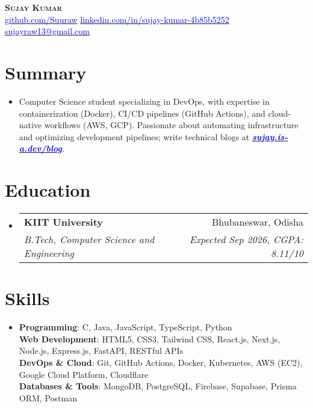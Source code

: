 \documentclass[letterpaper,11pt]{article}
\makeatletter
\newcommand{\resumeSubheading}[4]{
  \vspace{-3pt}\item
  \begin{tabular*}{0.98\textwidth}[t]{l@{\extracolsep{\fill}}r}
    \textbf{#1} & #2 \\
    \textit{\small#3} & \textit{\small #4} \\
  \end{tabular*}\vspace{-6pt}
}
\newcommand{\resumeSubHeadingListStart}{\begin{itemize}[leftmargin=0.1in, label={}]}
\newcommand{\resumeSubHeadingListEnd}{\end{itemize}\vspace{-6pt}}
\makeatother
\begin{document}
\begin{center}
  \textbf{\Huge \scshape Sujay Kumar} \\ \vspace{8pt}
  \small
  \vspace{2pt}
 \href{https://github.com/Suuraw}{\textcolor{blue}{github.com/Suuraw}} \quad
\href{https://linkedin.com/in/sujay-kumar-4b85b5252}{\textcolor{blue}{linkedin.com/in/sujay-kumar-4b85b5252}} \quad
 \href{mailto:sujayraw13@gmail.com}{\textcolor{blue}{sujayraw13@gmail.com}} 
\end{center}
\vspace{-8pt}

\section{Summary}
\vspace{4pt}
\resumeSubHeadingListStart
\item{Computer Science student specializing in DevOps, with expertise in containerization (Docker), CI/CD pipelines (GitHub Actions), and cloud-native workflows (AWS, GCP). Passionate about automating infrastructure and optimizing development pipelines; write technical blogs at \href{https://sujay.is-a.dev/blog}{\textcolor{blue}{\textbf{\textit{sujay.is-a.dev/blog}}}}.}
\resumeSubHeadingListEnd

\section{Education}
\vspace{4pt}
\resumeSubHeadingListStart
  \resumeSubheading{KIIT University}{Bhubaneswar, Odisha}{B.Tech, Computer Science and Engineering}{Expected Sep 2026, CGPA: 8.11/10}
\resumeSubHeadingListEnd

\section{Skills}
\vspace{4pt}
\resumeSubHeadingListStart
  \item{
    \textbf{Programming}: C, Java, JavaScript, TypeScript, Python \\ \vspace{2pt}
    \textbf{Web Development}: HTML5, CSS3, Tailwind CSS, React.js, Next.js, Node.js, Express.js, FastAPI, RESTful APIs \\ \vspace{2pt}
    \textbf{DevOps \& Cloud}: Git, GitHub Actions, Docker, Kubernetes, AWS (EC2), Google Cloud Platform, Cloudflare \\ \vspace{2pt}
    \textbf{Databases \& Tools}: MongoDB, PostgreSQL, Firebase, Supabase, Prisma ORM, Postman
  }
\resumeSubHeadingListEnd
\end{document}
